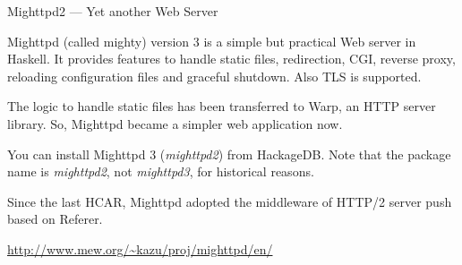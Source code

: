 \begin{hcarentry}[updated]{Mighttpd2 --- Yet another Web Server}
\label{mighttpd2}
\makeheader

Mighttpd (called mighty) version 3 is a simple but practical Web server in
Haskell. It provides features to handle static files, redirection, CGI,
reverse proxy, reloading configuration files and graceful shutdown. Also TLS
is supported.

The logic to handle static files has been transferred to Warp, an HTTP server
library. So, Mighttpd became a simpler web application now.

You can install Mighttpd 3 ({\it mighttpd2}) from HackageDB. Note that the
package name is {\it mighttpd2}, not {\it mighttpd3}, for historical reasons.

Since the last HCAR, Mighttpd adopted the middleware of HTTP/2 server push
based on Referer.

\FurtherReading
\begin{compactitem}
\item \url{http://www.mew.org/~kazu/proj/mighttpd/en/}
\end{compactitem}
\end{hcarentry}
